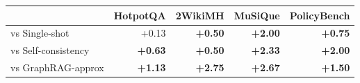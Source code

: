 \begin{tabular}{lrrrr}
\toprule
 & HotpotQA & 2WikiMH & MuSiQue & PolicyBench \\
\midrule
vs Single-shot & +0.13 & \textbf{+0.50} & \textbf{+2.00} & \textbf{+0.75} \\
vs Self-consistency & \textbf{+0.63} & \textbf{+0.50} & \textbf{+2.33} & \textbf{+2.00} \\
vs GraphRAG-approx & \textbf{+1.13} & \textbf{+2.75} & \textbf{+2.67} & \textbf{+1.50} \\
\bottomrule
\end{tabular}